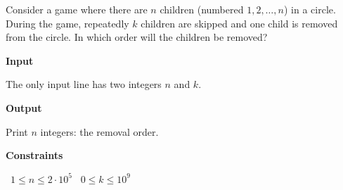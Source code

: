 Consider a game where there are $n$ children (numbered $1,2,\dots,n$) in a circle. During the game, repeatedly $k$ children are skipped and one child is removed from the circle. In which order will the children be removed?

\vspace{0.3cm}\noindent\textbf{Input}

The only input line has two integers $n$ and $k$.

\vspace{0.3cm}\noindent\textbf{Output}

Print $n$ integers: the removal order.

\vspace{0.3cm}\noindent\textbf{Constraints}

\textbullet\ $1 \le n \le 2 \cdot 10^5$
\textbullet\ $0 \le k \le 10^9$